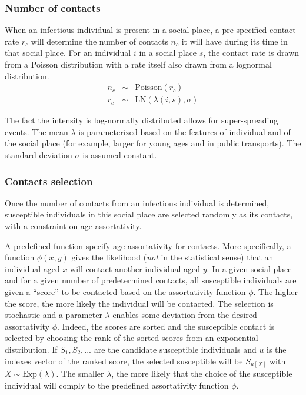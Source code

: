 \documentclass[11pt, onecolumn]{article}
\begin{document}
\subsubsection*{Number of contacts}

When an infectious individual is present in a social place, a pre-specified contact rate $r_c$ will determine the number of contacts $n_c$ it will have during its time in that social place. For an individual $i$ in a social place $s$, the contact rate is drawn from a Poisson distribution with a rate itself also drawn from a lognormal distribution. 
\begin{eqnarray}
n_c & \sim & \text{Poisson}(r_c)\\
r_c & \sim & \text{LN}(\lambda(i,s), \sigma)
\end{eqnarray}

The fact the intensity is log-normally distributed allows for super-spreading events. The mean $\lambda$ is parameterized based on the features of individual and of the social place (for example, larger for young ages and in public transports). The standard deviation $\sigma$ is assumed constant.

\subsubsection*{Contacts selection}

Once the number of contacts from an infectious individual is determined, susceptible individuals in this social place are selected randomly as its contacts, with a constraint on age assortativity.

A predefined function specify age assortativity for contacts. More specifically, a function $\phi(x,y)$ gives the likelihood (\emph{not} in the statistical sense) that an individual aged $x$ will contact another individual aged $y$.
In a given social place and for a given number of predetermined contacts, all susceptible individuals are given a ``score'' to be contacted based on the assortativity function $\phi$. 
The higher the score, the more likely the individual will be contacted. The selection is stochastic and a parameter $\lambda$ enables some deviation from the desired assortativity $\phi$.
Indeed, the scores are sorted and the susceptible contact is selected by choosing the rank of the sorted scores from an exponential distribution. If $S_1, S_2, ...$ are the candidate susceptible individuals and $u$ is the indexes vector of the ranked score, the selected susceptible will be $S_{u[X]}$ with $ X \sim \text{Exp}(\lambda) $. The smaller $\lambda$, the more likely that the choice of the susceptible individual will comply to the predefined assortativity function $\phi$.
\end{document}
